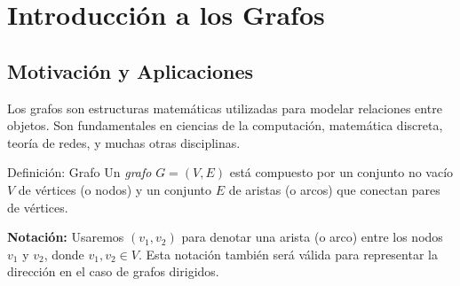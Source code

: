 
\section{Introducción a los Grafos}

\subsection{Motivación y Aplicaciones}

Los grafos son estructuras matemáticas utilizadas para modelar relaciones entre objetos. Son fundamentales en ciencias de la computación, matemática discreta, teoría de redes, y muchas otras disciplinas.

\begin{definitionblock}{Definición: Grafo}
Un \emph{grafo} $G = (V,E)$ está compuesto por un conjunto no vacío $V$ de vértices (o nodos) y un conjunto $E$ de aristas (o arcos) que conectan pares de vértices.
\end{definitionblock}
\noindent\textbf{Notación:} Usaremos $(v_1,v_2)$ para denotar una arista (o arco) entre los nodos $v_1$ y $v_2$, donde $v_1, v_2 \in V$. Esta notación también será válida para representar la dirección en el caso de grafos dirigidos.



